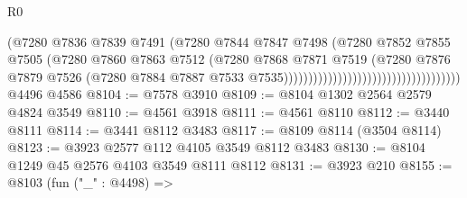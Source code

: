 \begin{lexlean}{R0}
\begin{coremodule}
                                                              (@7280
                                                                @7836
                                                                @7839
                                                                @7491
                                                                (@7280
                                                                  @7844
                                                                  @7847
                                                                  @7498
                                                                  (@7280
                                                                    @7852
                                                                    @7855
                                                                    @7505
                                                                    (@7280
                                                                      @7860
                                                                      @7863
                                                                      @7512
                                                                      (@7280
                                                                        @7868
                                                                        @7871
                                                                        @7519
                                                                        (@7280
                                                                          @7876
                                                                          @7879
                                                                          @7526
                                                                          (@7280
                                                                            @7884
                                                                            @7887
                                                                            @7533
                                                                            @7535))))))))))))))))))))))))))))))))))))
    @4496
    @4586
@8104 := @7578 @3910
@8109 := @8104 @1302 @2564 @2579 @4824 @3549
@8110 := @4561 @3918
@8111 := @4561 @8110
@8112 := @3440 @8111
@8114 := @3441 @8112 @3483
@8117 := @8109 @8114 (@3504 @8114)
@8123 := @3923 @2577 @112 @4105 @3549 @8112 @3483
@8130 := @8104 @1249 @45 @2576 @4103 @3549 @8111 @8112
@8131 := @3923 @210
@8155 := @8103
    (fun ("_" : @4498) =>

\end{coremodule}
\end{lexlean}
